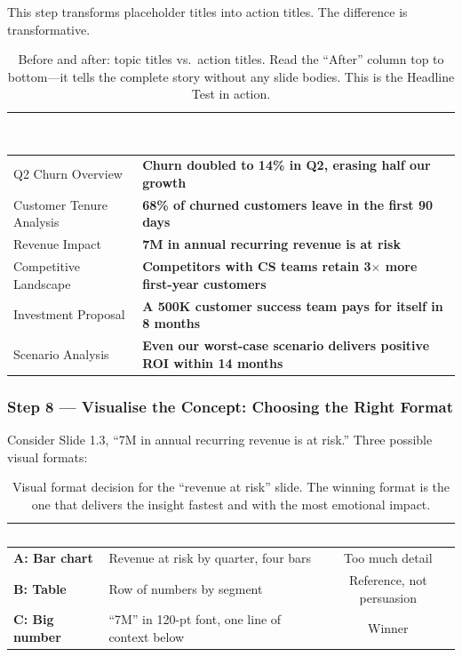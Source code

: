 This step transforms placeholder titles into action titles. The difference is transformative.

\begin{table}[H]
\centering
\small
{}
\begin{tabularx}{\textwidth}{>{\color{signalred}}X >{\color{heading}\bfseries}X}
\toprule
\rowcolor{tableheader}
\textcolor{white}{\textbf{Before (topic title)}} & \textcolor{white}{\textbf{After (action title)}} \\
\midrule
Q2 Churn Overview & Churn doubled to 14\% in Q2, erasing half our growth \\
Customer Tenure Analysis & 68\% of churned customers leave in the first 90 days \\
Revenue Impact & \texteuro{}7M in annual recurring revenue is at risk \\
Competitive Landscape & Competitors with CS teams retain 3$\times$ more first-year customers \\
Investment Proposal & A \texteuro{}500K customer success team pays for itself in 8 months \\
Scenario Analysis & Even our worst-case scenario delivers positive ROI within 14 months \\
\bottomrule
\end{tabularx}
\caption{Before and after: topic titles vs.\ action titles. Read the ``After'' column top to bottom---it tells the complete story without any slide bodies. This is the Headline Test in action.}
\end{table}

\subsubsection*{Step 8 --- Visualise the Concept: Choosing the Right Format}

Consider Slide 1.3, ``\texteuro{}7M in annual recurring revenue is at risk.'' Three possible visual formats:

\begin{table}[H]
\centering
\small
{}
\begin{tabularx}{\textwidth}{>{\bfseries\color{heading}}l X >{\color{heading}}c}
\toprule
\rowcolor{tableheader}
\textcolor{white}{\textbf{Option}} & \textcolor{white}{\textbf{Visual}} & \textcolor{white}{\textbf{Verdict}} \\
\midrule
A: Bar chart & Revenue at risk by quarter, four bars & Too much detail \\
B: Table & Row of numbers by segment & Reference, not persuasion \\
C: Big number & ``\texteuro{}7M'' in 120-pt font, one line of context below & Winner \\
\bottomrule
\end{tabularx}
\caption{Visual format decision for the ``revenue at risk'' slide. The winning format is the one that delivers the insight fastest and with the most emotional impact.}
\end{table}

